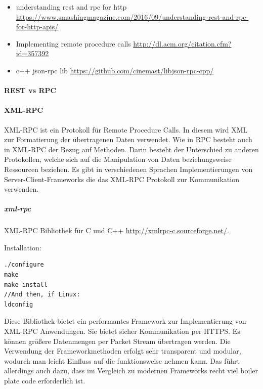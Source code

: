 \documentclass[a4paper,10pt]{article}
\begin{document}
\begin{itemize}
 \item understanding rest and rpc for http \url{https://www.smashingmagazine.com/2016/09/understanding-rest-and-rpc-for-http-apis/}
 \item Implementing remote procedure calls \url{http://dl.acm.org/citation.cfm?id=357392}
 \item c++ json-rpc lib \url{https://github.com/cinemast/libjson-rpc-cpp/}
\end{itemize}

\paragraph{REST vs RPC}


\paragraph{XML-RPC}

XML-RPC ist ein Protokoll für Remote Procedure Calls.
In diesem wird XML zur Formatierung der übertragenen Daten verwendet.
Wie in RPC besteht auch in XML-RPC der Bezug auf Methoden.
Darin besteht der Unterschied zu anderen Protokollen, welche sich auf die Manipulation von Daten beziehungsweise Ressourcen beziehen.
Es gibt in verschiedenen Sprachen Implementierungen von Server-Client-Frameworks die das XML-RPC Protokoll zur Kommunikation verwenden.

\subparagraph{xml-rpc}

XML-RPC Bibliothek für C und C++ \url{http://xmlrpc-c.sourceforge.net/}.

Installation: \\
\begin{lstlisting}[frame=single,caption=XML-RPC Installation]
./configure
make
make install
//And then, if Linux:
ldconfig
\end{lstlisting}

Diese Bibliothek bietet ein performantes Framework zur Implementierung von XML-RPC Anwendungen.
Sie bietet sicher Kommunikation per HTTPS.
Es können größere Datenmengen per Packet Stream übertragen werden.
Die Verwendung der Frameworkmethoden erfolgt sehr transparent und modular, wodurch man leicht Einfluss auf die funktionsweise nehmen kann.
Das führt allerdings auch dazu, dass im Vergleich zu modernen Frameworks recht viel boiler plate code erforderlich ist.
\end{document}
